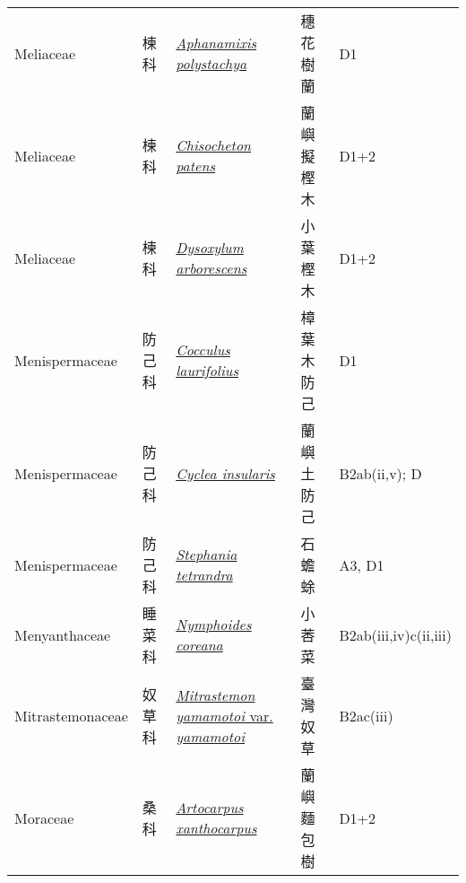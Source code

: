 {\begin{longtable}{L{2.5cm}L{2cm}L{5cm}L{2.5cm}L{3cm}}
    Meliaceae & 楝科 & \href{http://www.theplantlist.org/tpl1.1/search?q=Aphanamixis+polystachya}{\textit{Aphanamixis polystachya} } & 穗花樹蘭 & D1    \\
    Meliaceae & 楝科 & \href{http://www.theplantlist.org/tpl1.1/search?q=Chisocheton+patens}{\textit{Chisocheton patens} } & 蘭嶼擬樫木 & D1+2    \\
    Meliaceae & 楝科 & \href{http://www.theplantlist.org/tpl1.1/search?q=Dysoxylum+arborescens}{\textit{Dysoxylum arborescens} } & 小葉樫木 & D1+2    \\
    Menispermaceae & 防己科 & \href{http://www.theplantlist.org/tpl1.1/search?q=Cocculus+laurifolius}{\textit{Cocculus laurifolius} } & 樟葉木防己 & D1    \\
    Menispermaceae & 防己科 & \href{http://www.theplantlist.org/tpl1.1/search?q=Cyclea+insularis}{\textit{Cyclea insularis} } & 蘭嶼土防己 & B2ab(ii,v); D    \\
    Menispermaceae & 防己科 & \href{http://www.theplantlist.org/tpl1.1/search?q=Stephania+tetrandra}{\textit{Stephania tetrandra} } & 石蟾蜍 & A3, D1    \\
    Menyanthaceae & 睡菜科 & \href{http://www.theplantlist.org/tpl1.1/search?q=Nymphoides+coreana}{\textit{Nymphoides coreana} } & 小莕菜 & B2ab(iii,iv)c(ii,iii)    \\
    Mitrastemonaceae & 奴草科 & \href{http://www.theplantlist.org/tpl1.1/search?q=Mitrastemon+yamamotoi+var.+yamamotoi}{\textit{Mitrastemon yamamotoi} var. \textit{yamamotoi} } & 臺灣奴草 & B2ac(iii)    \\
    Moraceae & 桑科 & \href{http://www.theplantlist.org/tpl1.1/search?q=Artocarpus+xanthocarpus}{\textit{Artocarpus xanthocarpus} } & 蘭嶼麵包樹 & D1+2    \\

\end{longtable}}
